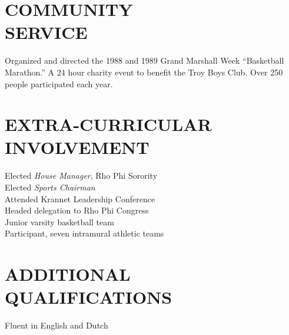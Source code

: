 \documentclass[margin]{res}
\begin{document}
\begin{resume}
\section{COMMUNITY \\ SERVICE}
	Organized and directed the 1988 and 1989 Grand Marshall Week \newline ``Basketball Marathon.''
	A 24 hour charity event to benefit the Troy Boys Club. Over 250 people participated each year. 

\section{EXTRA-CURRICULAR \\ INVOLVEMENT}             
            Elected {\it House Manager}, Rho Phi Sorority \\
            Elected {\it Sports Chairman} \\
            Attended Krannet Leadership Conference \\
                Headed delegation to Rho Phi Congress \\
                Junior varsity basketball team \\
                Participant, seven intramural athletic teams 
 
\section{ADDITIONAL \\QUALIFICATIONS}
			Fluent in English and Dutch

\end{resume}
\end{document}
